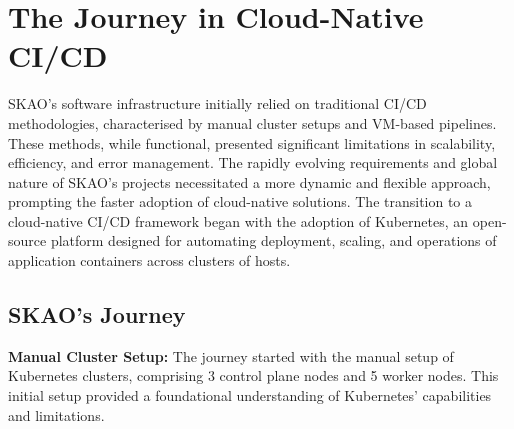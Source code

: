 \documentclass[a4paper]{spie}  %
\begin{document}
\section{The Journey in Cloud-Native CI/CD}

SKAO's software infrastructure initially relied on traditional CI/CD methodologies, characterised by manual cluster setups and VM-based pipelines. These methods, while functional, presented significant limitations in scalability, efficiency, and error management. The rapidly evolving requirements and global nature of SKAO's projects necessitated a more dynamic and flexible approach, prompting the faster adoption of cloud-native solutions. The transition to a cloud-native CI/CD framework began with the adoption of Kubernetes, an open-source platform designed for automating deployment, scaling, and operations of application containers across clusters of hosts.

\subsection{SKAO's Journey}

\noindent\textbf{Manual Cluster Setup:} The journey started with the manual setup of Kubernetes clusters, comprising 3 control plane nodes and 5 worker nodes. This initial setup provided a foundational understanding of Kubernetes' capabilities and limitations.
\end{document}
